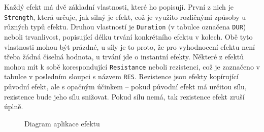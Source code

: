 Každý efekt má dvě základní vlastnosti, které ho popisují. První z nich je \texttt{Strength}, která určuje, jak silný je efekt, což je využito rozličnými způsoby u různých typů efektu. Druhou vlastností je \texttt{Duration} (v tabulce označena \texttt{DUR}) neboli trvanlivost, popisující délku trvání konkrétního efektu v kolech. Obě tyto vlastnosti mohou být prázdné, u síly je to proto, že pro vyhodnocení efektu není třeba žádná číselná hodnota, u trvání jde o instantní efekty. Některé z efektů mohou mít k sobě korespondující \texttt{Resistance} neboli rezistenci, což je zaznačeno v tabulce v posledním sloupci s názvem \texttt{RES}. Rezistence jsou efekty kopírující původní efekt, ale s opačným účinkem -- pokud původní efekt má určitou sílu, rezistence bude jeho sílu snižovat. Pokud sílu nemá, tak rezistence efekt zruší úplně.

\begin{figure}[h]
    \centering
    \caption{Diagram aplikace efektu}
    \label{diag:apply_effect}
\end{figure}

